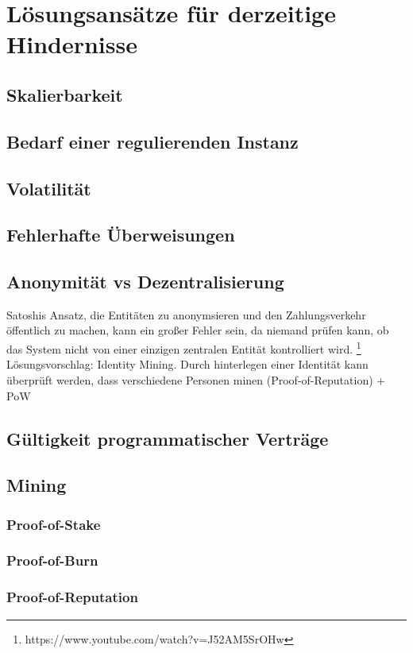 \chapter{Lösungsansätze für derzeitige Hindernisse}
\section{Skalierbarkeit}
\section{Bedarf einer regulierenden Instanz}
\section{Volatilität}
\section{Fehlerhafte Überweisungen}
\section{Anonymität vs Dezentralisierung}
Satoshis Ansatz, die Entitäten zu anonymsieren und den Zahlungsverkehr öffentlich zu machen, kann ein großer Fehler sein, da niemand prüfen kann, ob das System nicht von einer einzigen zentralen Entität kontrolliert wird. \footnote{https://www.youtube.com/watch?v=J52AM5SrOHw}
Lösungsvorschlag: Identity Mining. Durch hinterlegen einer Identität kann überprüft werden, dass verschiedene Personen minen (Proof-of-Reputation) + PoW
\section{Gültigkeit programmatischer Verträge}
\section{Mining}
\subsection{Proof-of-Stake}
\subsection{Proof-of-Burn}
\subsection{Proof-of-Reputation}